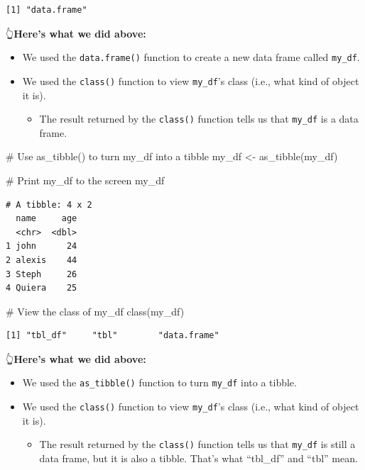 \documentclass[
  letterpaper,
  DIV=11,
  numbers=noendperiod]{scrreprt}
\newenvironment{Shaded}{\begin{snugshade}}{\end{snugshade}}
\newcommand{\CommentTok}[1]{\textcolor[rgb]{0.37,0.37,0.37}{#1}}
\newcommand{\FunctionTok}[1]{\textcolor[rgb]{0.28,0.35,0.67}{#1}}
\newcommand{\NormalTok}[1]{\textcolor[rgb]{0.00,0.23,0.31}{#1}}
\newcommand{\OtherTok}[1]{\textcolor[rgb]{0.00,0.23,0.31}{#1}}
\providecommand{\tightlist}{%
  \setlength{\itemsep}{0pt}\setlength{\parskip}{0pt}}\usepackage{longtable,booktabs,array}
\begin{document}
\begin{verbatim}
[1] "data.frame"
\end{verbatim}

👆\textbf{Here's what we did above:}

\begin{itemize}
\item
  We used the \texttt{data.frame()} function to create a new data frame
  called \texttt{my\_df}.
\item
  We used the \texttt{class()} function to view \texttt{my\_df}'s class
  (i.e., what kind of object it is).

  \begin{itemize}
  \tightlist
  \item
    The result returned by the \texttt{class()} function tells us that
    \texttt{my\_df} is a data frame.
  \end{itemize}
\end{itemize}

\begin{Shaded}
\begin{Highlighting}[]
\CommentTok{\# Use as\_tibble() to turn my\_df into a tibble}
\NormalTok{my\_df }\OtherTok{\textless{}{-}} \FunctionTok{as\_tibble}\NormalTok{(my\_df)}

\CommentTok{\# Print my\_df to the screen}
\NormalTok{my\_df}
\end{Highlighting}
\end{Shaded}

\begin{verbatim}
# A tibble: 4 x 2
  name     age
  <chr>  <dbl>
1 john      24
2 alexis    44
3 Steph     26
4 Quiera    25
\end{verbatim}

\begin{Shaded}
\begin{Highlighting}[]
\CommentTok{\# View the class of my\_df}
\FunctionTok{class}\NormalTok{(my\_df)}
\end{Highlighting}
\end{Shaded}

\begin{verbatim}
[1] "tbl_df"     "tbl"        "data.frame"
\end{verbatim}

👆\textbf{Here's what we did above:}

\begin{itemize}
\item
  We used the \texttt{as\_tibble()} function to turn \texttt{my\_df}
  into a tibble.
\item
  We used the \texttt{class()} function to view \texttt{my\_df}'s class
  (i.e., what kind of object it is).

  \begin{itemize}
  \tightlist
  \item
    The result returned by the \texttt{class()} function tells us that
    \texttt{my\_df} is still a data frame, but it is also a tibble.
    That's what ``tbl\_df'' and ``tbl'' mean.
  \end{itemize}
\end{itemize}
\end{document}
